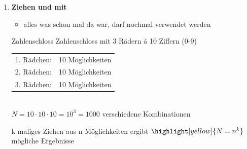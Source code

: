 \begin{note}
\begin{enumerate}[leftmargin=*]
    \item [1)] {
        \textcolor{myb}{\textbf{Ziehen  und mit }}
        \begin{itemize}[leftmargin=*]
            \item alles was schon mal da war, darf nochmal verwendet werden
        \end{itemize}
        \begin{Example}{Zahlenschloss}{}
            Zahlenschloss mit 3 Rädern \'{a} 10 Ziffern (0-9)\\[1.0ex]
            \begin{tabularx}{0.5\linewidth}{X X}
                1. Rädchen: & 10 Möglichkeiten\\
                2. Rädchen: & 10 Möglichkeiten\\
                3. Rädchen: & 10 Möglichkeiten\\
            \end{tabularx}\\[1.5ex]
            $N = 10 \cdot 10 \cdot 10 = 10^3 = 1000$ verschiedene Kombinationen
        \end{Example}
        \begin{Corollary}{}{}
            k-maliges Ziehen aus n Möglichkeiten ergibt \textbf{$\highlight[yellow]{N = n^k}$} mögliche Ergebnisse
        \end{Corollary}
        }
\end{enumerate}
\end{note}

